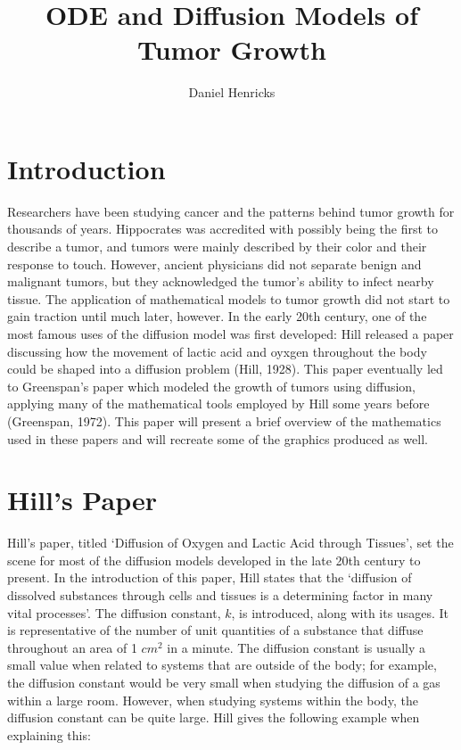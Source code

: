 \documentclass{article}
\title{ODE and Diffusion Models of Tumor Growth}
\author{Daniel Henricks}
\begin{document}
\maketitle

\section{Introduction}

Researchers have been studying cancer and the patterns behind tumor growth for thousands of years. Hippocrates
was accredited with possibly being the first to describe a tumor, and tumors were mainly described by their color
and their response to touch. However, ancient physicians did not separate benign and malignant tumors, but they
acknowledged the tumor's ability to infect nearby tissue. The application of mathematical models to tumor growth
did not start to gain traction until much later, however. In the early 20th century, one of the most famous uses of
the diffusion model was first developed: Hill released a paper discussing how the movement of lactic acid
and oyxgen throughout the body could be shaped into a diffusion problem (Hill, 1928). This paper eventually led to
Greenspan's paper which modeled the growth of tumors using diffusion, applying many of the mathematical tools employed
by Hill some years before (Greenspan, 1972). This paper will present a brief overview of the mathematics used in these
papers and will recreate some of the graphics produced as well.

\section{Hill's Paper}

Hill's paper, titled `Diffusion of Oxygen and Lactic Acid through Tissues', set the scene for most of the diffusion models
developed in the late 20th century to present. In the introduction of this paper, Hill states that the
`diffusion of dissolved substances through cells and tissues is a determining factor in many vital processes'.
The diffusion constant, $k$, is introduced, along with its usages. It is representative of the number of unit quantities
of a substance that diffuse throughout an area of 1 $cm^2$ in a minute. The diffusion constant is usually a small value
when related to systems that are outside of the body; for example, the diffusion constant would be very small when studying
the diffusion of a gas within a large room. However, when studying systems within the body, the diffusion constant can be quite large.
Hill gives the following example when explaining this:
\end{document}
